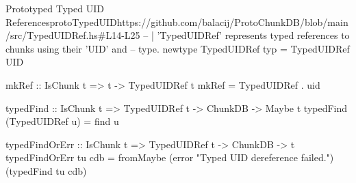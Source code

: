 \begin{haskell}{Prototyped Typed UID References}{protoTypedUID}{https://github.com/balacij/ProtoChunkDB/blob/main/src/TypedUIDRef.hs\#L14-L25}
-- | 'TypedUIDRef' represents typed references to chunks using their 'UID' and
-- type.
newtype TypedUIDRef typ = TypedUIDRef UID

mkRef :: IsChunk t => t -> TypedUIDRef t
mkRef = TypedUIDRef . uid

typedFind :: IsChunk t => TypedUIDRef t -> ChunkDB -> Maybe t
typedFind (TypedUIDRef u) = find u

typedFindOrErr :: IsChunk t => TypedUIDRef t -> ChunkDB -> t
typedFindOrErr tu cdb = fromMaybe (error "Typed UID dereference failed.") (typedFind tu cdb)
\end{haskell}
